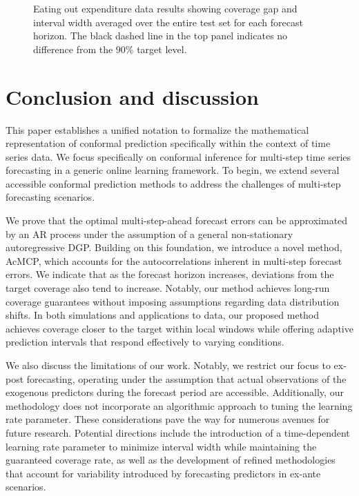 \documentclass[
  11pt,
  a4paper,
]{article}
\theoremstyle{plain}
\theoremstyle{remark}
\begin{document}
\begin{figure}


\caption{\label{fig-cafe_cov}Eating out expenditure data results showing
coverage gap and interval width averaged over the entire test set for
each forecast horizon. The black dashed line in the top panel indicates
no difference from the \(90\%\) target level.}

\end{figure}%

\section{Conclusion and discussion}\label{conclusion-and-discussion}

This paper establishes a unified notation to formalize the mathematical
representation of conformal prediction specifically within the context
of time series data. We focus specifically on conformal inference for
multi-step time series forecasting in a generic online learning
framework. To begin, we extend several accessible conformal prediction
methods to address the challenges of multi-step forecasting scenarios.

We prove that the optimal multi-step-ahead forecast errors can be
approximated by an AR process under the assumption of a general
non-stationary autoregressive DGP. Building on this foundation, we
introduce a novel method, AcMCP, which accounts for the autocorrelations
inherent in multi-step forecast errors. We indicate that as the forecast
horizon increases, deviations from the target coverage also tend to
increase. Notably, our method achieves long-run coverage guarantees
without imposing assumptions regarding data distribution shifts. In both
simulations and applications to data, our proposed method achieves
coverage closer to the target within local windows while offering
adaptive prediction intervals that respond effectively to varying
conditions.

We also discuss the limitations of our work. Notably, we restrict our
focus to ex-post forecasting, operating under the assumption that actual
observations of the exogenous predictors during the forecast period are
accessible. Additionally, our methodology does not incorporate an
algorithmic approach to tuning the learning rate parameter. These
considerations pave the way for numerous avenues for future research.
Potential directions include the introduction of a time-dependent
learning rate parameter to minimize interval width while maintaining the
guaranteed coverage rate, as well as the development of refined
methodologies that account for variability introduced by forecasting
predictors in ex-ante scenarios.
\end{document}
